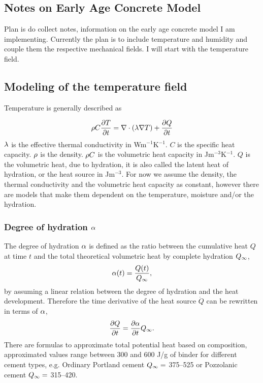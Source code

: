 
\subsection{Notes on Early Age Concrete Model}
Plan is do collect notes, information on the early age concrete model I am implementing.
Currently the plan is to include temperature and humidity and couple them the respective mechanical fields.
I will start with the temperature field.

\subsection{Modeling of the temperature field}
Temperature is generally described as

\begin{align}
	\rho C \frac{\partial T}{\partial t} = \nabla \cdot (\lambda \nabla T) + \frac{\partial Q}{\partial t} \label{eq:heat1}
\end{align}
$\lambda$ is the effective thermal conductivity in Wm$^{-1}$K$^{-1}$.
$C$ is the specific heat capacity.
$\rho$ is the density.
$\rho C$ is the volumetric heat capacity in Jm$^{-3}$K$^{-1}$.
$Q$ is the volumetric heat, due to hydration, it is also called the latent heat of hydration, or the heat source in Jm$^{-3}$.
For now we assume the density, the thermal conductivity and the volumetric heat capacity as constant, however there are models that make them dependent on the temperature, moisture and/or the hydration.


\subsubsection{Degree of hydration $\alpha$}
The degree of hydration $\alpha$ is defined as the ratio between the cumulative heat $Q$ at time $t$ and the total theoretical volumetric heat by complete hydration $Q_{\infty}$,
\begin{align}
	\alpha(t) = \frac{Q(t)}{Q_{\infty}},
\end{align}
by assuming a linear relation between the degree of hydration and the heat development.
Therefore the time derivative of the heat source $\dot{Q}$ can be rewritten in terms of $\alpha$, 
\begin{align}
	\frac{\partial Q}{\partial t} = \frac{\partial \alpha}{\partial t} Q_{\infty}. \label{eq:qdotalphadot}
\end{align}
There are formulas to approximate total potential heat based on composition, approximated values range between 300 and 600 J/g of binder for different cement types, e.g. Ordinary Portland cement $Q_{\infty} =$ 375–525 or Pozzolanic cement $Q_{\infty} =$ 315–420.  

